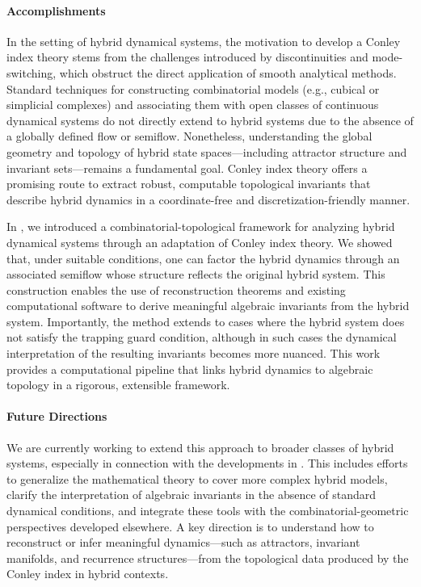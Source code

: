 \documentclass[letterpaper,11pt]{article}
\begin{document}
\paragraph{Accomplishments}
In the setting of hybrid dynamical systems, the motivation to develop a Conley index theory stems from the challenges introduced by discontinuities and mode-switching, which obstruct the direct application of smooth analytical methods.
Standard techniques for constructing combinatorial models (e.g., cubical or simplicial complexes) and associating them with open classes of continuous dynamical systems do not directly extend to hybrid systems due to the absence of a globally defined flow or semiflow.
Nonetheless, understanding the global geometry and topology of hybrid state spaces—including attractor structure and invariant sets—remains a fundamental goal.
Conley index theory offers a promising route to extract robust, computable topological invariants that describe hybrid dynamics in a coordinate-free and discretization-friendly manner.

In \cite{KaRi-hybridCIT}, we introduced a combinatorial-topological framework for analyzing hybrid dynamical systems through an adaptation of Conley index theory.
We showed that, under suitable conditions, one can factor the hybrid dynamics through an associated semiflow whose structure reflects the original hybrid system.
This construction enables the use of reconstruction theorems and existing computational software to derive meaningful algebraic invariants from the hybrid system.
Importantly, the method extends to cases where the hybrid system does not satisfy the trapping guard condition, although in such cases the dynamical interpretation of the resulting invariants becomes more nuanced.
This work provides a computational pipeline that links hybrid dynamics to algebraic topology in a rigorous, extensible framework.

\paragraph{Future Directions}
We are currently working to extend this approach to broader classes of hybrid systems, especially in connection with the developments in .
This includes efforts to generalize the mathematical theory to cover more complex hybrid models, clarify the interpretation of algebraic invariants in the absence of standard dynamical conditions, and integrate these tools with the combinatorial-geometric perspectives developed elsewhere.
A key direction is to understand how to reconstruct or infer meaningful dynamics—such as attractors, invariant manifolds, and recurrence structures—from the topological data produced by the Conley index in hybrid contexts.
\end{document}
